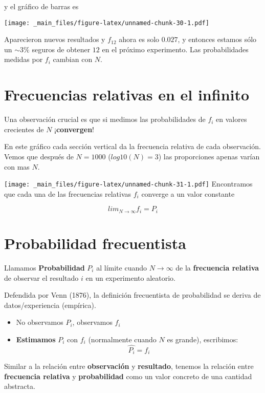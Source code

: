 \documentclass[
]{book}
\providecommand{\tightlist}{%
  \setlength{\itemsep}{0pt}\setlength{\parskip}{0pt}}
\begin{document}
y el gráfico de barras es

\texttt{[image: \_main\_files/figure-latex/unnamed-chunk-30-1.pdf]}

Aparecieron nuevos resultados y \(f_{12}\) ahora es solo \(0.027\), y entonces estamos sólo un \(\sim 3\%\) seguros de obtener \(12\) en el próximo experimento. Las probabilidades medidas por \(f_i\) cambian con \(N\).

\hypertarget{frecuencias-relativas-en-el-infinito}{%
\section{Frecuencias relativas en el infinito}\label{frecuencias-relativas-en-el-infinito}}

Una observación crucial es que si medimos las probabilidades de \(f_i\) en valores crecientes de \(N\) ¡\textbf{convergen}!

En este gráfico cada sección vertical da la frecuencia relativa de cada observación. Vemos que después de \(N=1000\) (\(log10(N)=3\)) las proporciones apenas varían con mas \(N\).

\texttt{[image: \_main\_files/figure-latex/unnamed-chunk-31-1.pdf]}
Encontramos que cada una de las frecuencias relativas \(f_i\) converge a un valor constante

\[lim_{N\rightarrow \infty} f_i = P_i\]

\hypertarget{probabilidad-frecuentista}{%
\section{Probabilidad frecuentista}\label{probabilidad-frecuentista}}

Llamamos \textbf{Probabilidad} \(P_i\) al límite cuando \(N \rightarrow \infty\) de la \textbf{frecuencia relativa} de observar el resultado \(i\) en un experimento aleatorio.

Defendida por Venn (1876), la definición frecuentista de probabilidad se deriva de datos/experiencia (empírica).

\begin{itemize}
\tightlist
\item
  No observamos \(P_i\), observamos \(f_i\)
\item
  \textbf{Estimamos} \(P_i\) con \(f_i\) (normalmente cuando \(N\) es grande), escribimos: \[\hat{P_i}=f_i\]
\end{itemize}

Similar a la relación entre \textbf{observación} y \textbf{resultado}, tenemos la relación entre \textbf{frecuencia relativa} y \textbf{probabilidad} como un valor concreto de una cantidad abstracta.
\end{document}
